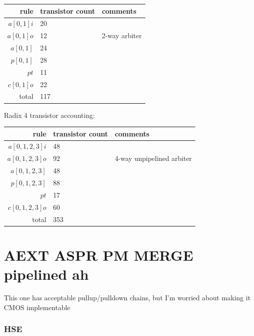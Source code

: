 \documentclass{article}
\begin{document}
\begin{center}
    \begin{tabular}{|r|l|l|}
    \hline
    rule & transistor count & comments \\ \hline
    $a[0,1]i$ & 20 & \\ \hline
    $a[0,1]o$ & 12 & 2-way arbiter \\ \hline
    $a[0,1]$ & 24 & \\ \hline
    $p[0,1]$ & 28 & \\ \hline
    $pt$ & 11 & \\ \hline
    $c[0,1]o$ & 22 & \\ \hline
    \hline total & 117 & \\ \hline
    \end{tabular}
\end{center}

\noindent
Radix 4 transistor accounting:

\begin{center}
    \begin{tabular}{|r|l|l|}
    \hline
    rule & transistor count & comments \\ \hline
    $a[0,1,2,3]i$ & 48 & \\ \hline
    $a[0,1,2,3]o$ & 92 & 4-way unpipelined arbiter \\ \hline
    $a[0,1,2,3]$ & 48 & \\ \hline
    $p[0,1,2,3]$ & 88 & \\ \hline
    $pt$ & 17 & \\ \hline
    $c[0,1,2,3]o$ & 60 & \\ \hline
    \hline total & 353 & \\ \hline
    \end{tabular}
\end{center}

\section{AEXT ASPR PM MERGE pipelined ah \label{sec:AEXT_ASPR_PM_MERGE_p_ah}}

This one has acceptable pullup/pulldown chains, but I'm worried about making it CMOS implementable

\subsubsection*{HSE}
\end{document}
